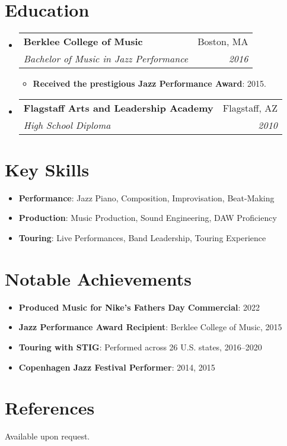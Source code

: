 \documentclass[letterpaper, 10pt]{article}
\makeatletter
\newcommand{\resumeItem}[2]{
\item\small{
    \textbf{#1}{: #2 \vspace{-2pt}}
  }
}
\newcommand{\resumeSubheading}[4]{
  \vspace{-1pt}\item{
    \begin{tabular*}{0.97\textwidth}{l@{\extracolsep{\fill}}r}
      \textbf{#1} & #2 \\
      \textit{\small#3} & \textit{\small #4} \\
    \end{tabular*}\vspace{-5pt}}
}
\newcommand{\resumeSubHeadingListStart}{\begin{itemize}[leftmargin=*]}
\newcommand{\resumeSubHeadingListEnd}{\end{itemize}}
\newcommand{\resumeItemListStart}{\justify\begin{itemize}}
\newcommand{\resumeItemListEnd}{\end{itemize}\vspace{-5pt}}
\makeatother
\begin{document}
\section{Education}
\resumeSubHeadingListStart

\resumeSubheading
{Berklee College of Music}{Boston, MA}
{Bachelor of Music in Jazz Performance}{2016}
\resumeItemListStart
\resumeItem{Received the prestigious Jazz Performance Award}{2015.}
\resumeItemListEnd
\vspace{15pt}
\resumeSubheading
{Flagstaff Arts and Leadership Academy}{Flagstaff, AZ}
{High School Diploma}{2010}
\resumeSubHeadingListEnd

\section{Key Skills}
\resumeSubHeadingListStart
\resumeItem{Performance}{Jazz Piano, Composition, Improvisation, Beat-Making}
\resumeItem{Production}{Music Production, Sound Engineering, DAW Proficiency}
\resumeItem{Touring}{Live Performances, Band Leadership, Touring Experience}
\resumeSubHeadingListEnd

\section{Notable Achievements}
\resumeSubHeadingListStart
\resumeItem{Produced Music for Nike's Fathers Day Commercial}{2022}
\resumeItem{Jazz Performance Award Recipient}{Berklee College of Music, 2015}
\resumeItem{Touring with STIG}{Performed across 26 U.S. states, 2016–2020}
\resumeItem{Copenhagen Jazz Festival Performer}{2014, 2015}
\resumeSubHeadingListEnd

\section{References}
Available upon request.

\end{document}
